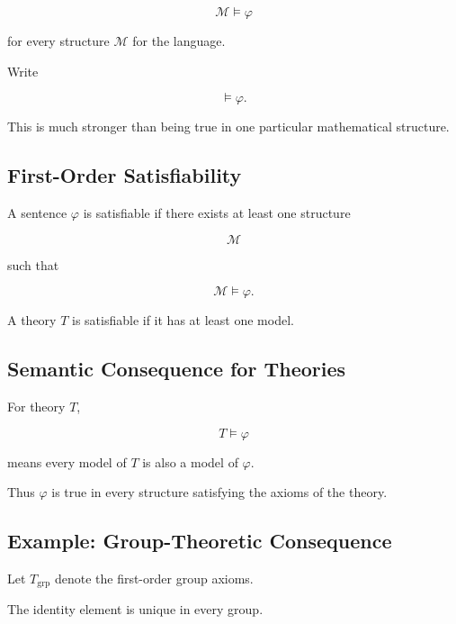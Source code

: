 \[
\boxed{
\mathcal{M}\models\varphi
}
\]

for every structure \(\mathcal{M}\) for the language.

Write

\[
\boxed{
\models\varphi.
}
\]

This is much stronger than being true in one particular mathematical
structure.

\subsection{First-Order Satisfiability}
\label{subsec:first-order-satisfiability}

A sentence \(\varphi\) is satisfiable if there exists at least one structure

\[
\mathcal{M}
\]

such that

\[
\boxed{
\mathcal{M}\models\varphi.
}
\]

A theory \(T\) is satisfiable if it has at least one model.

\subsection{Semantic Consequence for Theories}
\label{subsec:semantic-consequence-theories}

For theory \(T\),

\[
\boxed{
T\models\varphi
}
\]

means every model of \(T\) is also a model of \(\varphi\).

Thus \(\varphi\) is true in every structure satisfying the axioms of the
theory.

\subsection{Example: Group-Theoretic Consequence}
\label{subsec:group-theoretic-consequence}

Let \(T_{\mathrm{grp}}\) denote the first-order group axioms.

The identity element is unique in every group.

